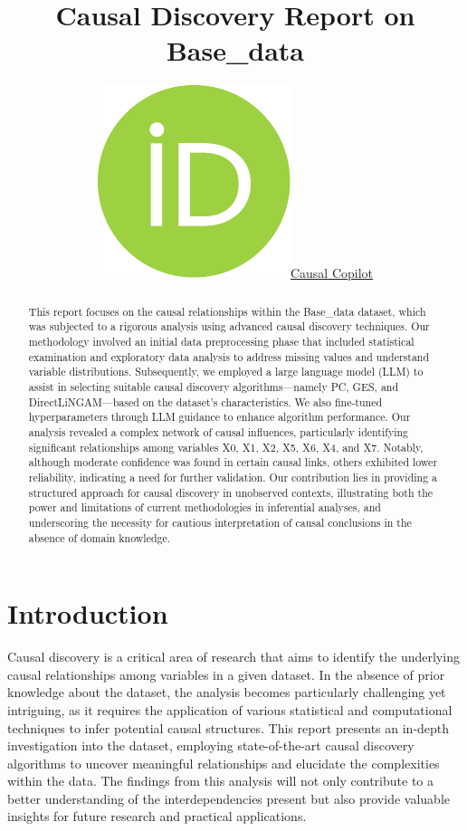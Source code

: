 \documentclass{article}
\title{Causal Discovery Report on Base\_data}
\author{ \href{https://orcid.org/0000-0000-0000-0000}{\includegraphics[scale=0.06]{postprocess/context/orcid.pdf}\hspace{1mm}Causal Copilot}}
\begin{document}
\maketitle

\begin{abstract}
This report focuses on the causal relationships within the Base\_data dataset, which was subjected to a rigorous analysis using advanced causal discovery techniques. Our methodology involved an initial data preprocessing phase that included statistical examination and exploratory data analysis to address missing values and understand variable distributions. Subsequently, we employed a large language model (LLM) to assist in selecting suitable causal discovery algorithms—namely PC, GES, and DirectLiNGAM—based on the dataset's characteristics. We also fine-tuned hyperparameters through LLM guidance to enhance algorithm performance. Our analysis revealed a complex network of causal influences, particularly identifying significant relationships among variables X0, X1, X2, X5, X6, X4, and X7. Notably, although moderate confidence was found in certain causal links, others exhibited lower reliability, indicating a need for further validation. Our contribution lies in providing a structured approach for causal discovery in unobserved contexts, illustrating both the power and limitations of current methodologies in inferential analyses, and underscoring the necessity for cautious interpretation of causal conclusions in the absence of domain knowledge.
\end{abstract}


\raggedbottom
\section{Introduction}
Causal discovery is a critical area of research that aims to identify the underlying causal relationships among variables in a given dataset. In the absence of prior knowledge about the dataset, the analysis becomes particularly challenging yet intriguing, as it requires the application of various statistical and computational techniques to infer potential causal structures. This report presents an in-depth investigation into the dataset, employing state-of-the-art causal discovery algorithms to uncover meaningful relationships and elucidate the complexities within the data. The findings from this analysis will not only contribute to a better understanding of the interdependencies present but also provide valuable insights for future research and practical applications.
\end{document}
